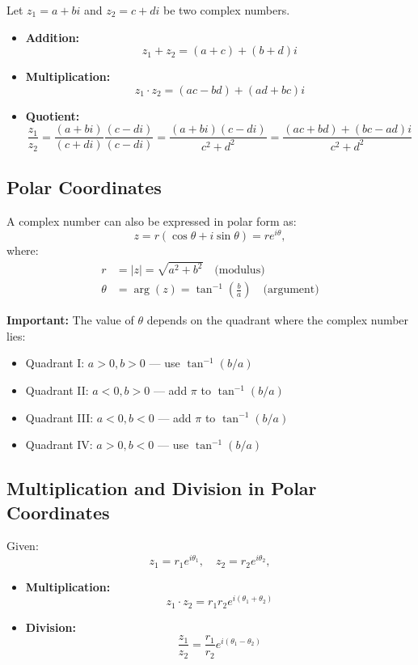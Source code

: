 Let \( z_1 = a + bi \) and \( z_2 = c + di \) be two complex numbers.

\begin{itemize}
  \item \textbf{Addition:} 
  \[
  z_1 + z_2 = (a + c) + (b + d)i
  \]
  
  \item \textbf{Multiplication:}
  \[
  z_1 \cdot z_2 = (ac - bd) + (ad + bc)i
  \]
  
  \item \textbf{Quotient:}
  \[
  \frac{z_1}{z_2} = \frac{(a + bi)}{(c + di)} \frac{(c - di)}{(c - di)} = \frac{(a + bi)(c - di)}{c^2 + d^2} = \frac{(ac + bd) + (bc - ad)i}{c^2 + d^2}
  \]
\end{itemize}

\subsection{Polar Coordinates}

A complex number can also be expressed in polar form as:
\[
z = r(\cos \theta + i \sin \theta) = re^{i\theta},
\]
where:
\begin{align*}
r &= |z| = \sqrt{a^2 + b^2} \quad \text{(modulus)} \\
\theta &= \arg(z) = \tan^{-1}\left(\frac{b}{a}\right) \quad \text{(argument)}
\end{align*}

\textbf{Important:} The value of \( \theta \) depends on the quadrant where the complex number lies:
\begin{itemize}
  \item Quadrant I: \( a > 0, b > 0 \) — use \( \tan^{-1}(b/a) \)
  \item Quadrant II: \( a < 0, b > 0 \) — add \( \pi \) to \( \tan^{-1}(b/a) \)
  \item Quadrant III: \( a < 0, b < 0 \) — add \( \pi \) to \( \tan^{-1}(b/a) \)
  \item Quadrant IV: \( a > 0, b < 0 \) — use \( \tan^{-1}(b/a) \)
\end{itemize}

\subsection{Multiplication and Division in Polar Coordinates}

Given:
\[
z_1 = r_1 e^{i\theta_1}, \quad z_2 = r_2 e^{i\theta_2},
\]

\begin{itemize}
  \item \textbf{Multiplication:}
  \[
  z_1 \cdot z_2 = r_1 r_2 e^{i(\theta_1 + \theta_2)}
  \]

  \item \textbf{Division:}
  \[
  \frac{z_1}{z_2} = \frac{r_1}{r_2} e^{i(\theta_1 - \theta_2)}
  \]
\end{itemize}

